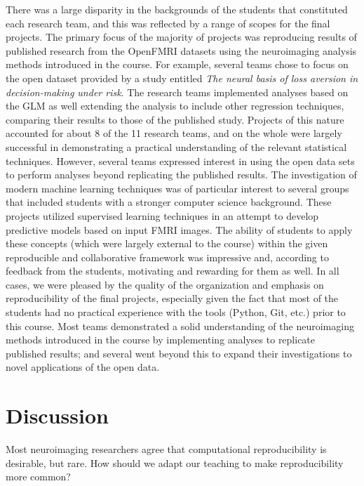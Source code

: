 There was a large disparity in the backgrounds of the students that constituted 
each research team, and this was reflected by a range of scopes for the
final projects.
The primary focus of the majority of projects was reproducing results
of published research from the OpenFMRI datasets using the neuroimaging 
analysis methods introduced in the course.
For example, several teams chose to focus on the open dataset provided by a
study entitled \textit{The neural basis of loss aversion in decision-making
under risk}\cite{tom2007neutral}.
The research teams implemented analyses based on the GLM as well extending
the analysis to include other regression techniques, comparing their results
to those of the published study.
Projects of this nature accounted for about 8 of the 11 research teams, and
on the whole were largely successful in demonstrating a practical understanding
of the relevant statistical techniques.
However, several teams expressed interest in using the open data sets to 
perform analyses beyond replicating the published results.
The investigation of modern machine learning techniques was of particular 
interest to several groups that included students with a stronger computer
science background.
These projects utilized supervised learning techniques in an attempt to 
develop predictive models based on input FMRI images.
The ability of students to apply these concepts (which were largely external
to the course) within the given reproducible and collaborative 
framework was impressive and, according to feedback from the students,
motivating and rewarding for them as well.
In all cases, we were pleased by the quality of the organization and emphasis
on reproducibility of the final projects, especially given the fact that
most of the students had no practical experience with the tools (Python, Git,
etc.) prior to this course.
Most teams demonstrated a solid understanding of the neuroimaging methods introduced
in the course by implementing analyses to replicate published results; and 
several went beyond this to expand their investigations to novel applications
of the open data.

\section{Discussion}\label{discussion}

Most neuroimaging researchers agree that computational reproducibility is
desirable, but rare.  How should we adapt our teaching to make reproducibility
more common?


